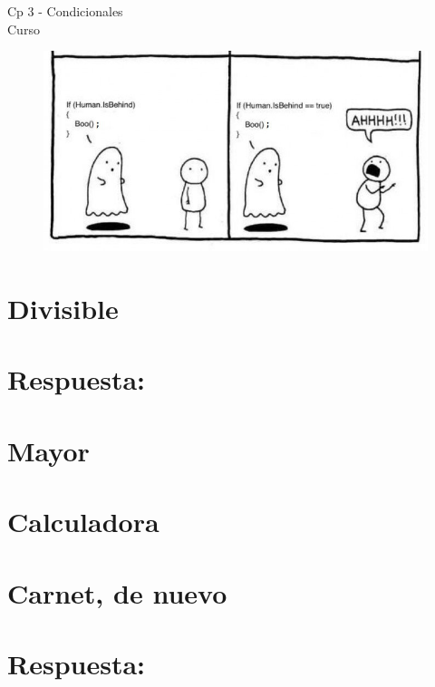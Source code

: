 \begin{center}
    \begin{large}
    Cp 3 - Condicionales\\
    Curso \academicyear\\
    \end{large}
    \begin{figure}[h]
    	\centering
    	\includegraphics[width=0.6\linewidth]{cp3/conditional.jpg}
    \end{figure}
\end{center}

\section{Divisible}


\ifshowanswers
\section*{Respuesta:}

\fi

\section{Mayor}


\section{Calculadora}


\section{Carnet, de nuevo}


\ifshowanswers
\section*{Respuesta:}

\fi

